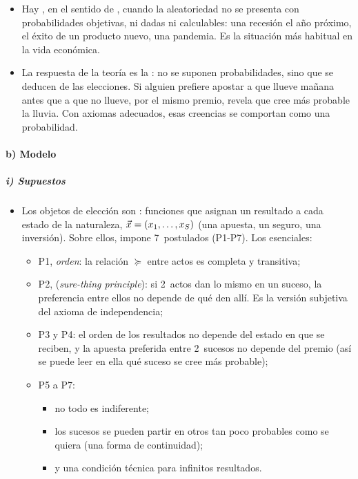 \documentclass[11pt]{article}
\begin{document}
\begin{itemize}
\item Hay , en el sentido de \textcite{Knight1921Risk}, cuando la aleatoriedad no se presenta con probabilidades objetivas, ni dadas ni calculables: una recesión el año próximo, el éxito de un producto nuevo, una pandemia. Es la situación más habitual en la vida económica.
\item La respuesta de la teoría es la : no se suponen probabilidades, sino que se deducen de las elecciones. Si alguien prefiere apostar a que llueve mañana antes que a que no llueve, por el mismo premio, revela que cree más probable la lluvia. Con axiomas adecuados, esas creencias se comportan como una probabilidad.
\end{itemize}

\paragraph{b) Modelo}

\subparagraph{i) Supuestos}

\begin{itemize}
\item Los objetos de elección son : funciones que asignan un resultado a cada estado de la naturaleza, $\vec{x}=(x_1,\dots,x_S)$ (una apuesta, un seguro, una inversión). Sobre ellos, \textcite{Savage1954Foundations} impone 7~postulados (P1-P7). Los esenciales:
  \begin{itemize}
  \item P1, \emph{orden}: la relación $\succcurlyeq$ entre actos es completa y transitiva;
  \item P2,  (\emph{sure-thing principle}): si 2~actos dan lo mismo en un suceso, la preferencia entre ellos no depende de qué den allí. Es la versión subjetiva del axioma de independencia;
  \item P3 y P4: el orden de los resultados no depende del estado en que se reciben, y la apuesta preferida entre 2~sucesos no depende del premio (así se puede leer en ella qué suceso se cree más probable);
  \item P5 a P7:
    \begin{itemize}
    \item no todo es indiferente;
    \item los sucesos se pueden partir en otros tan poco probables como se quiera (una forma de continuidad);
    \item y una condición técnica para infinitos resultados.
    \end{itemize}
  \end{itemize}
\end{itemize}
\end{document}
